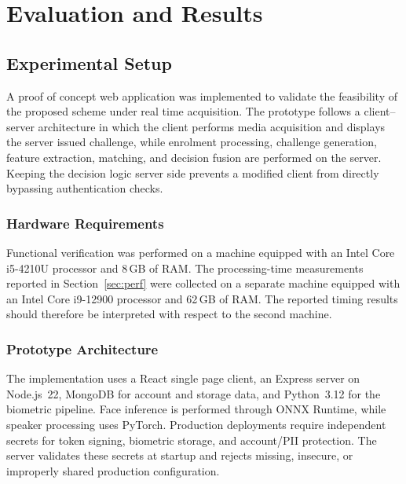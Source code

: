 \documentclass[runningheads]{llncs}
\begin{document}
\section{Evaluation and Results}\label{sec:eval}

\subsection{Experimental Setup}
A proof of concept web application was implemented to validate the feasibility of the proposed scheme under real time acquisition. The prototype follows a client--server architecture in which the client performs media acquisition and displays the server issued challenge, while enrolment processing, challenge generation, feature extraction, matching, and decision fusion are performed on the server. Keeping the decision logic server side prevents a modified client from directly bypassing authentication checks.

\subsubsection{Hardware Requirements}\label{sec:hw}
Functional verification was performed on a machine equipped with an Intel Core i5-4210U processor and 8\,GB of RAM. The processing-time measurements reported in Section~\ref{sec:perf} were collected on a separate machine equipped with an Intel Core i9-12900 processor and 62\,GB of RAM. The reported timing results should therefore be interpreted with respect to the second machine.

\subsubsection{Prototype Architecture}
The implementation uses a React single page client, an Express server on Node.js~22, MongoDB for account and storage data, and Python~3.12 for the biometric pipeline. Face inference is performed through ONNX Runtime, while speaker processing uses PyTorch. Production deployments require independent secrets for token signing, biometric storage, and account/PII protection. The server validates these secrets at startup and rejects missing, insecure, or improperly shared production configuration.
\end{document}
